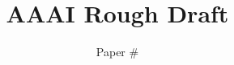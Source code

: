\documentclass[a4paper]{article}
\begin{document}
\title{AAAI Rough Draft}
\author{Paper \#}
\maketitle{}

\begin{abstract}

\end{abstract}




 








\twocolumn 


\end{document}
